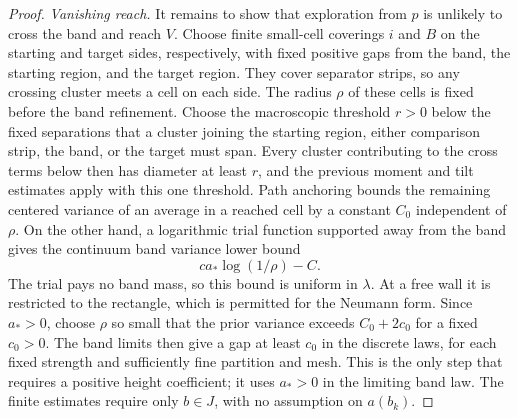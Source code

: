 \begin{proof}
\emph{Vanishing reach.}
It remains to show that exploration from \(p\) is unlikely to cross
the band and reach \(V\).  Choose finite small-cell coverings
\(i\) and \(B\) on the starting and target sides, respectively,
with fixed positive gaps from the band, the starting region, and
the target region.  They cover separator strips,
so any crossing cluster meets a cell on each side.  The radius
\(\rho\) of these cells is fixed before the band refinement.
Choose the macroscopic threshold \(r>0\) below the fixed separations
that a cluster joining the starting region, either comparison strip,
the band, or the target must span.  Every cluster contributing to
the cross terms below then has diameter at least \(r\), and the
previous moment and tilt estimates apply with this one threshold.
Path anchoring bounds the remaining centered variance of an average
in a reached cell by a constant \(C_0\) independent of \(\rho\).
On the other hand, a logarithmic trial function supported away from
the band gives the continuum band variance lower bound
\[
                   c a_*\log(1/\rho)-C.
\]
The trial pays no band mass, so this bound is uniform in \(\lambda\).
At a free wall it is restricted to the rectangle, which is permitted
for the Neumann form.  Since \(a_*>0\), choose \(\rho\) so small
that the prior variance exceeds \(C_0+2c_0\) for a fixed \(c_0>0\).
The band limits then give a gap at least \(c_0\) in the discrete
laws, for each fixed strength and sufficiently fine partition and mesh.
This is the only step that requires a positive height coefficient;
it uses \(a_*>0\) in the limiting band law.  The finite estimates
require only \(b\in J\), with no assumption on \(a(b_k)\).


\end{proof}
